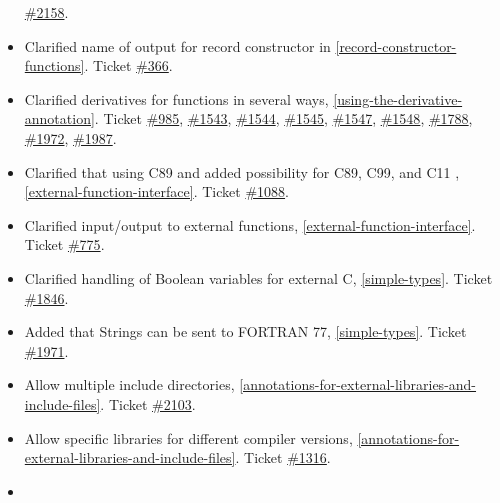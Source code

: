 \begin{itemize}
  \href{https://github.com/modelica/ModelicaSpecification/issues/2158}{\#2158}.
\item
  Clarified name of output for record constructor in \autoref{record-constructor-functions}.
  Ticket \href{https://github.com/modelica/ModelicaSpecification/issues/366}{\#366}.
\item
  Clarified derivatives for functions in several ways, \autoref{using-the-derivative-annotation}.
  Ticket \href{https://github.com/modelica/ModelicaSpecification/issues/985}{\#985},
  \href{https://github.com/modelica/ModelicaSpecification/issues/1543}{\#1543},
  \href{https://github.com/modelica/ModelicaSpecification/issues/1544}{\#1544},
  \href{https://github.com/modelica/ModelicaSpecification/issues/1545}{\#1545},
  \href{https://github.com/modelica/ModelicaSpecification/issues/1547}{\#1547},
  \href{https://github.com/modelica/ModelicaSpecification/issues/1548}{\#1548},
  \href{https://github.com/modelica/ModelicaSpecification/issues/1788}{\#1788},
  \href{https://github.com/modelica/ModelicaSpecification/issues/1972}{\#1972},
  \href{https://github.com/modelica/ModelicaSpecification/issues/1987}{\#1987}.
\item
  Clarified that using C89 and added possibility for C89, C99, and C11 ,
  \autoref{external-function-interface}. Ticket
  \href{https://github.com/modelica/ModelicaSpecification/issues/1088}{\#1088}.
\item
  Clarified input/output to external functions, \autoref{external-function-interface}. Ticket
  \href{https://github.com/modelica/ModelicaSpecification/issues/775}{\#775}.
\item
  Clarified handling of Boolean variables for external C,
  \autoref{simple-types}. Ticket
  \href{https://github.com/modelica/ModelicaSpecification/issues/1846}{\#1846}.
\item
  Added that Strings can be sent to FORTRAN 77, \autoref{simple-types}. Ticket
  \href{https://github.com/modelica/ModelicaSpecification/issues/1971}{\#1971}.
\item
  Allow multiple include directories, \autoref{annotations-for-external-libraries-and-include-files}. Ticket
  \href{https://github.com/modelica/ModelicaSpecification/issues/2103}{\#2103}.
\item
  Allow specific libraries for different compiler versions,
  \autoref{annotations-for-external-libraries-and-include-files}. Ticket
  \href{https://github.com/modelica/ModelicaSpecification/issues/1316}{\#1316}.
\item

\end{itemize}
